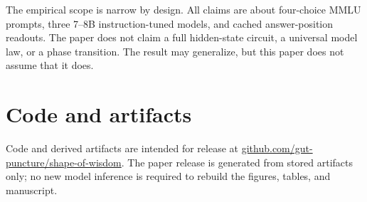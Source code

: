 \documentclass[10pt,twocolumn]{article}
\begin{document}
The empirical scope is narrow by design. All claims are about four-choice MMLU prompts, three 7--8B instruction-tuned models, and cached answer-position readouts. The paper does not claim a full hidden-state circuit, a universal model law, or a phase transition. The result may generalize, but this paper does not assume that it does.

\section*{Code and artifacts}

Code and derived artifacts are intended for release at \href{https://github.com/gut-puncture/shape-of-wisdom}{github.com/gut-puncture/shape-of-wisdom}. The paper release is generated from stored artifacts only; no new model inference is required to rebuild the figures, tables, and manuscript.

\balance


\end{document}
